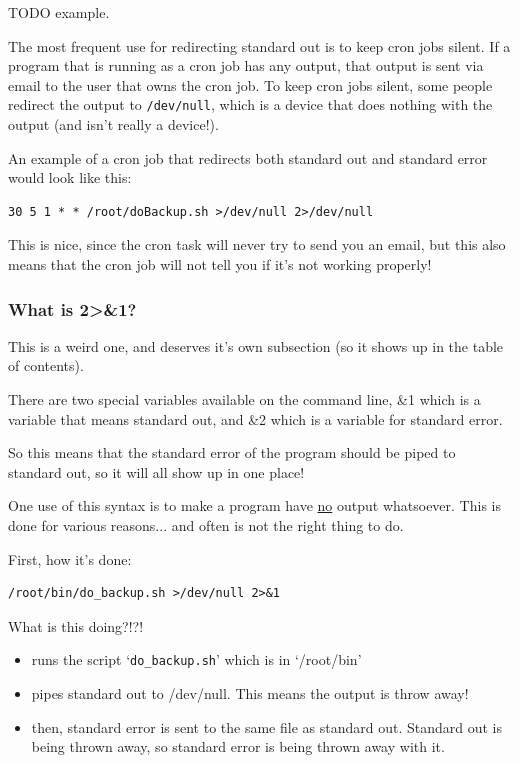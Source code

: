 TODO example. 

The most frequent use for redirecting standard out is to 
keep cron jobs silent. If a program that is running as a cron job
has any output, that output is sent via email to the user that
owns the cron job. To keep cron jobs silent, some people redirect the 
output to {\tt /dev/null}, which is a device that does nothing with the output (and isn't really a device!).

An example of a cron job that redirects both standard out and standard error would look like this:

\begin{verbatim}
30 5 1 * * /root/doBackup.sh >/dev/null 2>/dev/null
\end{verbatim}    

This is nice, since the cron task will never try to send you an email, 
but this also means that the cron job will not tell you if it's not working properly!

\subsubsection{What is 2\textgreater\&1?}
This is a weird one, and deserves it's own subsection (so it shows up in the 
table of contents).

There are two special variables available on the command line, \&1
which is a variable that means standard out, and \&2 which is 
a variable for standard error. 

So this means that the standard error of the program should be 
piped to standard out, so it will all show up in one place!

One use of this syntax is to make a program have \underline{no} output
whatsoever. This is done for various reasons... and often is not the
right thing to do.

First, how it's done:

\begin{verbatim}
/root/bin/do_backup.sh >/dev/null 2>&1
\end{verbatim}

What is this doing?!?!

\begin{itemize}
\item runs the script `{\tt do\_backup.sh}' which is in `/root/bin'
\item pipes standard out to /dev/null. This means the output is throw away!
\item then, standard error is sent to the same file as standard out. Standard
out is being thrown away, so standard error is being thrown away with it.
\end{itemize}

